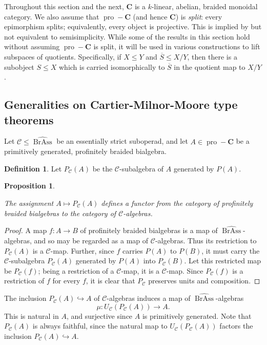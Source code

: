 \documentclass[12pt]{article}
\DeclareMathOperator{\pro}{pro}
\DeclareMathOperator{\BrAss}{BrAss}
\newcommand{\BrAsshat}{\widehat{\BrAss}} %
\newcommand{\CC} {\mathcal{C}}
\newcommand{\bC} {\mathbf{C}}
\newcommand{\proC}{\pro\!-\bC}
\theoremstyle{plain}
\newtheorem{prop}[thm]{Proposition}
\theoremstyle{definition}
\newtheorem{defn}[thm]{Definition}
\theoremstyle{remark}
\begin{document}
Throughout this section and the next, $\bC$ is a $k$-linear, abelian, braided monoidal category.  We also assume that $\proC$ (and hence $\bC$) is \emph{split}: every epimorphism splits; equivalently, every object is projective.  This is implied by but not equivalent to semisimplicity.  While some of the results in this section hold without assuming $\proC$ is split, it will be used in various constructions to lift subspaces of quotients.  Specifically, if $X \leq Y$ and $\overline{S} \leq X/Y$, then there is a subobject $S \leq X$ which is carried isomorphically to $\overline{S}$ in the quotient map to $X/Y$.

\subsection{Generalities on Cartier-Milnor-Moore type theorems} \label{mm_gen_section} 

Let $\CC \leq \BrAsshat$ be an essentially strict suboperad, and let $A \in \proC$ be a primitively generated, profinitely braided bialgebra.

\begin{defn} Let $P_{\CC}(A)$ be the $\CC$-subalgebra of $A$ generated by $P(A)$.  \end{defn}

\begin{prop} \label{P_C_functorial_prop}

The assignment $A \mapsto P_{\CC}(A)$ defines a functor from the category of profinitely braided bialgebras to the category of $\CC$-algebras. 

\end{prop}

\begin{proof}

A map $f:A \to B$ of profinitely braided bialgebras is a map of $\BrAsshat$-algebras, and so may be regarded as a map of $\CC$-algebras.  Thus its restriction to $P_{\CC}(A)$ is a $\CC$-map.  Further, since $f$ carries $P(A)$ to $P(B)$, it must carry the $\CC$-subalgebra $P_{\CC}(A)$ generated by $P(A)$ into $P_{\CC}(B)$.  Let this restricted map be $P_{\CC}(f)$; being a restriction of a $\CC$-map, it is a $\CC$-map.  Since $P_{\CC}(f)$ is a restriction of $f$ for every $f$, it is clear that $P_{\CC}$ preserves units and composition.

\end{proof}

The inclusion $P_{\CC}(A) \hookrightarrow A$ of $\CC$-algebras induces a map of $\BrAsshat$-algebras
%
$$\mu: U_{\CC}(P_{\CC}(A)) \to A.$$
%
This is natural in $A$, and surjective since $A$ is primitively generated.  Note that $P_{\CC}(A)$ is always faithful, since the natural map to $U_{\CC}(P_{\CC}(A))$ factors the inclusion $P_{\CC}(A) \hookrightarrow A$.
\end{document}
